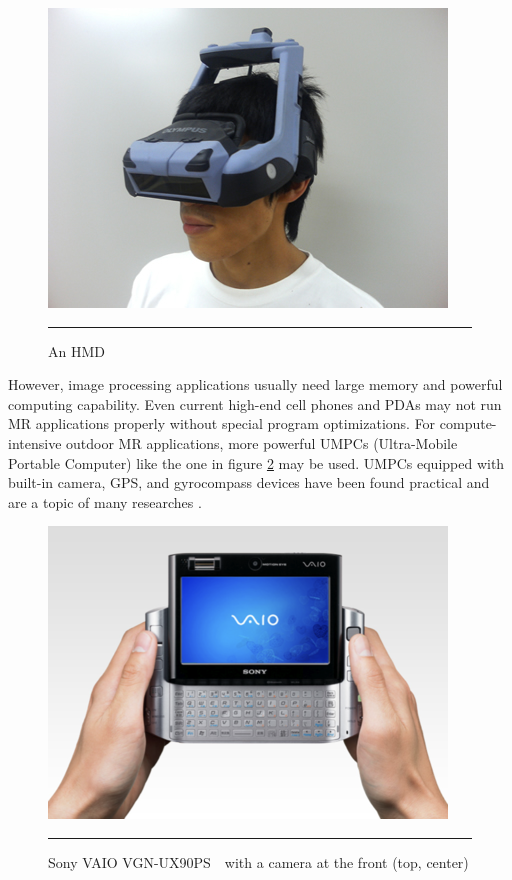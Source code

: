 \begin{figure}[htbp]
	\centering
	\includegraphics{./Primitives/hmd.jpg}
	\rule{35em}{0.5pt}
	\caption[An HMD]{An HMD}
	\label{fig:HMD}
\end{figure}

However, image processing applications usually need large memory and powerful computing capability. Even current high-end cell phones and PDAs may not run MR applications properly without special program optimizations. For compute-intensive outdoor MR applications, more powerful UMPCs (Ultra-Mobile Portable Computer) like the one in figure \ref{fig:VAIO} may be used. UMPCs equipped with built-in camera, GPS, and gyrocompass devices have been found practical and are a topic of many researches \cite{Reference2} \cite{Reference4} \cite{Reference13}.

\begin{figure}[htbp]
	\centering
	\includegraphics{./Primitives/vaio.png}
	\rule{35em}{0.5pt}
	\caption[Sony VAIO VGN-UX90PS with a camera at the front]{Sony VAIO VGN-UX90PS　with a camera at the front (top, center)}
	\label{fig:VAIO}
\end{figure}

